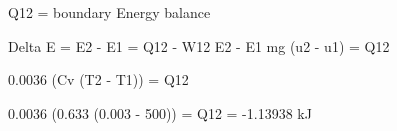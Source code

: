 Q12 = boundary  
Energy balance  

Delta E = E2 - E1 = Q12 - W12  
E2 - E1  
mg (u2 - u1) = Q12  

0.0036 (Cv (T2 - T1)) = Q12  

0.0036 (0.633 (0.003 - 500)) = Q12 = -1.13938 kJ